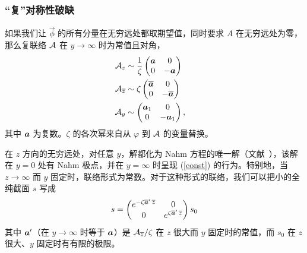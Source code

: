 \subsubsection{“复”对称性破缺}\label{compsym}



如果我们让 $\vec\phi$ 的所有分量在无穷远处都取期望值，同时要求 $A$ 在无穷远处为零，那么复联络 ${\mathcal A}$ 在 $y\to\infty$ 时为常值且对角，
\begin{align}\label{const}
{\mathcal A}_z &\sim \frac{1}{\zeta} \begin{pmatrix} {\boldsymbol{a}} & 0 \cr 0 & -{\boldsymbol{a}} \end{pmatrix} \cr
{\mathcal A}_{\overline z} &\sim \zeta \begin{pmatrix} \overline {{\boldsymbol{a}}} & 0 \cr 0 & - \overline {{\boldsymbol{a}}} \end{pmatrix} \cr
{\mathcal A}_y &\sim \begin{pmatrix} {\boldsymbol{a}}_1 & 0 \cr 0 & -{\boldsymbol{a}}_1 \end{pmatrix} ,\cr
\end{align} 其中 ${\boldsymbol{a}}$ 为复数。$\zeta$ 的各次幂来自从 $\varphi$ 到 ${\mathcal A}$ 的变量替换。

在 $z$ 方向的无穷远处，对任意 $y$，解都化为 Nahm 方程的唯一解（文献~\cite{Kronheimer}），该解在 $y=0$ 处有 Nahm 极点，并在 $y=\infty$ 时呈现 (\ref{const}) 的行为。特别地，当 $z\to\infty$ 而 $y$ 固定时，联络形式为常数。对于这种形式的联络，我们可以把小的全纯截面 $s$ 写成
\begin{equation}\label{goodform}
s = \begin{pmatrix} e^{- \zeta \overline {{\boldsymbol{a}}}'\, \overline z} & 0 \cr 0 &
e^{ \zeta \overline {{\boldsymbol{a}}}'\, \overline z}  \end{pmatrix} s_0
\end{equation}
其中 ${\boldsymbol{a}}'$（在 $y\to\infty$ 时等于 ${\boldsymbol{a}}$）是 ${\mathcal A}_{\overline z}/\zeta$ 在 $z$ 很大而 $y$ 固定时的常值，而 $s_0$ 在 $z$ 很大、$y$ 固定时有有限的极限。

